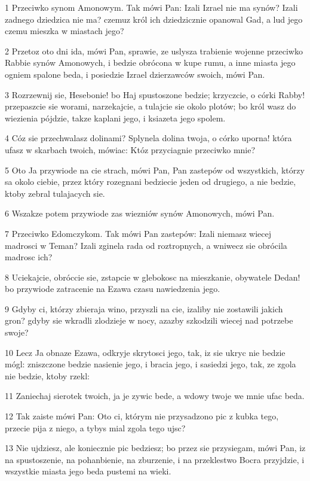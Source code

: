 \par 1 Przeciwko synom Amonowym. Tak mówi Pan: Izali Izrael nie ma synów? Izali zadnego dziedzica nie ma? czemuz król ich dziedzicznie opanowal Gad, a lud jego czemu mieszka w miastach jego?
\par 2 Przetoz oto dni ida, mówi Pan, sprawie, ze uslysza trabienie wojenne przeciwko Rabbie synów Amonowych, i bedzie obrócona w kupe rumu, a inne miasta jego ogniem spalone beda, i posiedzie Izrael dzierzawców swoich, mówi Pan.
\par 3 Rozrzewnij sie, Hesebonie! bo Haj spustoszone bedzie; krzyczcie, o córki Rabby! przepaszcie sie worami, narzekajcie, a tulajcie sie okolo plotów; bo król wasz do wiezienia pójdzie, takze kaplani jego, i ksiazeta jego spolem.
\par 4 Cóz sie przechwalasz dolinami? Splynela dolina twoja, o córko uporna! która ufasz w skarbach twoich, mówiac: Któz przyciagnie przeciwko mnie?
\par 5 Oto Ja przywiode na cie strach, mówi Pan, Pan zastepów od wszystkich, którzy sa okolo ciebie, przez który rozegnani bedziecie jeden od drugiego, a nie bedzie, ktoby zebral tulajacych sie.
\par 6 Wszakze potem przywiode zas wiezniów synów Amonowych, mówi Pan.
\par 7 Przeciwko Edomczykom. Tak mówi Pan zastepów: Izali niemasz wiecej madrosci w Teman? Izali zginela rada od roztropnych, a wniwecz sie obrócila madrosc ich?
\par 8 Uciekajcie, obróccie sie, zstapcie w glebokosc na mieszkanie, obywatele Dedan! bo przywiode zatracenie na Ezawa czasu nawiedzenia jego.
\par 9 Gdyby ci, którzy zbieraja wino, przyszli na cie, izaliby nie zostawili jakich gron? gdyby sie wkradli zlodzieje w nocy, azazby szkodzili wiecej nad potrzebe swoje?
\par 10 Lecz Ja obnaze Ezawa, odkryje skrytosci jego, tak, iz sie ukryc nie bedzie mógl: zniszczone bedzie nasienie jego, i bracia jego, i sasiedzi jego, tak, ze zgola nie bedzie, ktoby rzekl:
\par 11 Zaniechaj sierotek twoich, ja je zywic bede, a wdowy twoje we mnie ufac beda.
\par 12 Tak zaiste mówi Pan: Oto ci, którym nie przysadzono pic z kubka tego, przecie pija z niego, a tybys mial zgola tego ujsc?
\par 13 Nie ujdziesz, ale koniecznie pic bedziesz; bo przez sie przysiegam, mówi Pan, iz na spustoszenie, na pohanbienie, na zburzenie, i na przeklestwo Bocra przyjdzie, i wszystkie miasta jego beda pustemi na wieki.
